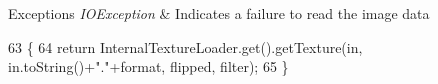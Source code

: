 \begin{DoxyExceptions}{Exceptions}
{\em I\+O\+Exception} & Indicates a failure to read the image data \\
\hline
\end{DoxyExceptions}

\begin{DoxyCode}
63                                                                                                            
               \{
64         \textcolor{keywordflow}{return} InternalTextureLoader.get().getTexture(in, in.toString()+\textcolor{stringliteral}{"."}+format, flipped, filter);
65     \}
\end{DoxyCode}
